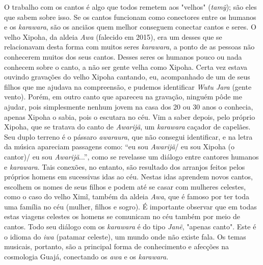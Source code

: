 O trabalho com os cantos é algo que todos remetem aos "velhos"
(\emph{tamỹ}); são eles que sabem sobre isso. Se os cantos funcionam
como conectores entre os humanos e os \emph{karawara}, são os anciãos
quem melhor conseguem conectar cantos e seres. O velho Xipoha, da aldeia
\emph{Awa} (falecido em 2015), era um desses que se relacionavam desta
forma com muitos seres \emph{karawara}, a ponto de as pessoas não
conhecerem muitos dos seus cantos. Desses seres os humanos pouco ou nada
conhecem sobre o canto, a não ser gente velha como Xipoha. Certa vez
estava ouvindo gravações do velho Xipoha cantando, eu, acompanhado de um
de seus filhos que me ajudava na compreensão, e pudemos identificar
\emph{Wutu Jara} (gente vento). Porém, em outro canto que apareceu na
gravação, ninguém pôde me ajudar, pois simplesmente nenhum jovem na casa
dos 20 ou 30 anos o conhecia, apenas Xipoha o sabia, pois o escutara no
céu. Vim a saber depois, pelo próprio Xipoha, que se tratava do canto de
\emph{Awarijã}, um \emph{karawara} caçador de capelães. Seu duplo
terreno é o pássaro \emph{awaraura}, que não consegui identificar, e na
letra da música apareciam passagens como: ``eu sou \emph{Awarijã}/ eu
sou Xipoha (o cantor)/ eu sou \emph{Awarijã}...'', como se revelasse um
diálogo entre cantores humanos e \emph{karawara}. Tais conexões, no
entanto, são resultado dos arranjos feitos pelos próprios homens em
sucessivas idas ao céu. Nestas idas aprendem novos cantos, escolhem os
nomes de seus filhos e podem até se casar com mulheres celestes, como o
caso do velho Ximĩ, também da aldeia \emph{Awa}, que é famoso por ter
toda uma família no céu (mulher, filhos e sogro). É importante observar
que em todas estas viagens celestes os homens se comunicam no céu também
por meio de cantos. Todo seu diálogo com os \emph{karawara} é do tipo
\emph{Janẽ}, "apenas canto". Este é o idioma do \emph{iwa} (patamar
celeste), um mundo onde não existe fala. Os temas musicais, portanto,
são a principal forma de conhecimento e afecções na cosmologia Guajá,
conectando os \emph{awa} e os \emph{karawara}.

